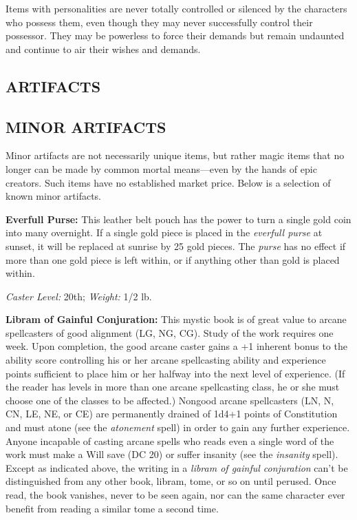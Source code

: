\documentclass{article}
\begin{document}
Items with personalities are never totally controlled or silenced by the characters 
who possess them, even though they may never successfully control their possessor. 
They may be powerless to force their demands but remain undaunted and continue 
to air their wishes and demands. 

\vspace{12pt}
\subsection*{{\LARGE{}ARTIFACTS }}

\vspace{12pt}
\subsection*{MINOR ARTIFACTS }

\parindent=0pt
Minor artifacts are not necessarily unique items, but rather magic items that no 
longer can be made by common mortal means---even by the hands of epic creators. 
Such items have no established market price. Below is a selection of known minor 
artifacts. 

\vspace{12pt}
\textbf{Everfull Purse: }This leather belt pouch has the power to turn a single 
gold coin into many overnight. If a single gold piece is placed in the \textit{everfull 
purse }at sunset, it will be replaced at sunrise by 25 gold pieces. The \textit{purse 
}has no effect if more than one gold piece is left within, or if anything other 
than gold is placed within. 

\textit{Caster Level: }20th; \textit{Weight: }1/2 lb. 

\textbf{Libram of Gainful Conjuration: }This mystic book is of great value to arcane 
spellcasters of good alignment (LG, NG, CG). Study of the work requires one week. 
Upon completion, the good arcane caster gains a +1 inherent bonus to the ability 
score controlling his or her arcane spellcasting ability and experience points 
sufficient to place him or her halfway into the next level of experience. (If the 
reader has levels in more than one arcane spellcasting class, he or she must choose 
one of the classes to be affected.) Nongood arcane spellcasters (LN, N, CN, LE, 
NE, or CE) are permanently drained of 1d4+1 points of Constitution and must atone 
(see the \textit{atonement }spell) in order to gain any further experience. Anyone 
incapable of casting arcane spells who reads even a single word of the work must 
make a Will save (DC 20) or suffer insanity (see the \textit{insanity }spell). 
Except as indicated above, the writing in a \textit{libram of gainful conjuration 
}can't be distinguished from any other book, libram, tome, or so on until perused. 
Once read, the book vanishes, never to be seen again, nor can the same character 
ever benefit from reading a similar tome a second time. 
\end{document}
